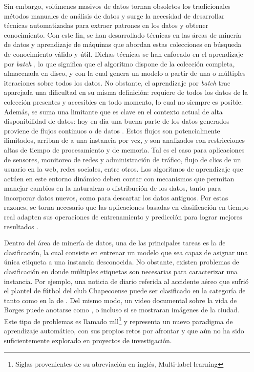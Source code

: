Sin embargo, volúmenes masivos de datos tornan obsoletos los tradicionales
métodos manuales de análisis de datos y surge la necesidad de desarrollar
técnicas automatizadas para extraer patrones en los datos y obtener
conocimiento. Con este fin, se han desarrollado técnicas en las áreas de minería
de datos y aprendizaje de máquinas que abordan estas colecciones en búsqueda de
conocimiento válido y útil. Dichas técnicas se han enfocado en el aprendizaje
por \textit{batch} \cite{gama_knowledge_2010}, lo que significa que el algoritmo
dispone de la colección completa, almacenada en disco, y con la cual genera un
modelo a partir de una o múltiples iteraciones sobre todos los datos. No
obstante, el aprendizaje por \textit{batch} trae aparejada una dificultad en su
misma definición: requiere de todos los datos de la colección presentes y
accesibles en todo momento,  lo cual no siempre es posible. Además, se suma una
limitante que es clave en el contexto actual de alta disponibilidad de datos:
hoy en día una buena parte de los datos generados proviene de flujos continuos o
 de datos \cite{bifet_big_2014}. Estos flujos son
potencialmente ilimitados, arriban de a una instancia por vez, y son analizados
con restricciones altas de tiempo de procesamiento y de memoria.  Tal es el caso
para aplicaciones de sensores, monitoreo de redes y administración de tráfico,
flujo de clics de un usuario en la web, redes sociales, entre otros.  Los
algoritmos de aprendizaje que actúen en este entorno dinámico deben contar con
mecanismos que permitan manejar cambios en la naturaleza o distribución de los
datos, tanto para incorporar datos nuevos, como para descartar los datos
antiguos. Por estas razones, se torna necesario que las aplicaciones basadas en
clasificación en tiempo real adapten sus operaciones de entrenamiento y
predicción para lograr mejores resultados \cite{sousa_multi-label_2018}.

Dentro del área de minería de datos, una de las principales tareas es la de
clasificación, la cual consiste en entrenar un modelo que sea capaz de asignar
una única etiqueta a una instancia desconocida. No obstante, existen problemas
de clasificación en donde múltiples etiquetas son necesarias para caracterizar
una instancia. Por ejemplo, una noticia de diario referida al accidente aéreo
que sufrió el plantel de fútbol del club Chapecoense puede ser clasificado en la
categoría de  tanto como en la de . Del
mismo modo, un video documental sobre la vida de Borges puede anotarse como
,  o incluso  si
se mostraran imágenes de la ciudad. Este tipo de problemas es llamado
\acrfull{mll}\footnote{Siglas provenientes de su abreviación en inglés,
	Multi-label learning} y representa un nuevo paradigma de aprendizaje automático,
con sus propios retos por afrontar y que aún no ha sido suficientemente
explorado en proyectos de investigación.

